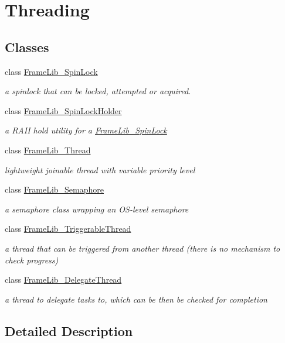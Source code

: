 \hypertarget{group___threading}{}\section{Threading}
\label{group___threading}
\subsection*{Classes}
\begin{DoxyCompactItemize}
\item 
class \hyperlink{class_frame_lib___spin_lock}{Frame\+Lib\+\_\+\+Spin\+Lock}
\begin{DoxyCompactList}\small\item\em a spinlock that can be locked, attempted or acquired. \end{DoxyCompactList}\item 
class \hyperlink{class_frame_lib___spin_lock_holder}{Frame\+Lib\+\_\+\+Spin\+Lock\+Holder}
\begin{DoxyCompactList}\small\item\em a R\+A\+II hold utility for a \hyperlink{class_frame_lib___spin_lock}{Frame\+Lib\+\_\+\+Spin\+Lock} \end{DoxyCompactList}\item 
class \hyperlink{class_frame_lib___thread}{Frame\+Lib\+\_\+\+Thread}
\begin{DoxyCompactList}\small\item\em lightweight joinable thread with variable priority level \end{DoxyCompactList}\item 
class \hyperlink{class_frame_lib___semaphore}{Frame\+Lib\+\_\+\+Semaphore}
\begin{DoxyCompactList}\small\item\em a semaphore class wrapping an O\+S-\/level semaphore \end{DoxyCompactList}\item 
class \hyperlink{class_frame_lib___triggerable_thread}{Frame\+Lib\+\_\+\+Triggerable\+Thread}
\begin{DoxyCompactList}\small\item\em a thread that can be triggered from another thread (there is no mechanism to check progress) \end{DoxyCompactList}\item 
class \hyperlink{class_frame_lib___delegate_thread}{Frame\+Lib\+\_\+\+Delegate\+Thread}
\begin{DoxyCompactList}\small\item\em a thread to delegate tasks to, which can be then be checked for completion \end{DoxyCompactList}\end{DoxyCompactItemize}


\subsection{Detailed Description}
